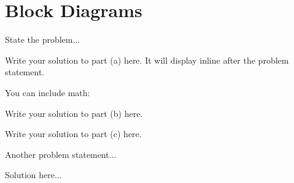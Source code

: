 \documentclass{../coursenotes}
\begin{document}
\section{Block Diagrams}

\begin{diagram}[scale=0.8]
\end{diagram}



 \label{prob:problem1}

State the problem...

\begin{solution}
Write your solution to part (a) here. It will display inline after the problem statement.

You can include math:
\begin{mmath}
 \eq {}
\end{mmath}
\end{solution}

\begin{solution}
Write your solution to part (b) here.
\end{solution}

\begin{solution}
Write your solution to part (c) here.
\end{solution}



Another problem statement...

\begin{solution}
Solution here...
\end{solution}
\end{document}
